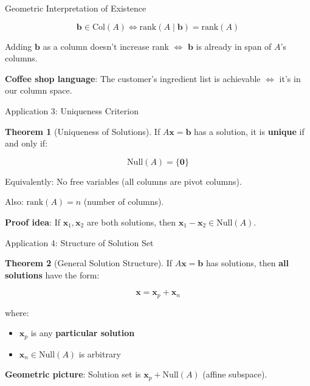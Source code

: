\documentclass[10pt]{beamer}
\theoremstyle{definition}
\newtheorem{thm}{Theorem}[section]
\newcommand{\x}[1]{\alert{\textbf{#1}}}
\begin{document}
\begin{frame}{Geometric Interpretation of Existence}

$$\mathbf{b} \in \text{Col}(A) \iff \text{rank}(A \mid \mathbf{b}) = \text{rank}(A)$$

\vspace{1em}

Adding $\mathbf{b}$ as a column doesn't increase rank $\iff$ $\mathbf{b}$ is already in span of $A$'s columns.

\vspace{1em}

\x{Coffee shop language}: The customer's ingredient list is achievable $\iff$ it's in our column space.

\end{frame}

\begin{frame}{Application 3: Uniqueness Criterion}

\begin{thm}[Uniqueness of Solutions]
If $A\mathbf{x} = \mathbf{b}$ has a solution, it is \textbf{unique} if and only if:

$$\text{Null}(A) = \{\mathbf{0}\}$$

Equivalently: No free variables (all columns are pivot columns).

Also: $\text{rank}(A) = n$ (number of columns).
\end{thm}

\vspace{1em}

\x{Proof idea}: If $\mathbf{x}_1, \mathbf{x}_2$ are both solutions, then $\mathbf{x}_1 - \mathbf{x}_2 \in \text{Null}(A)$.

\end{frame}

\begin{frame}{Application 4: Structure of Solution Set}

\begin{thm}[General Solution Structure]
If $A\mathbf{x} = \mathbf{b}$ has solutions, then \textbf{all solutions} have the form:

$$\mathbf{x} = \mathbf{x}_p + \mathbf{x}_n$$

where:
\begin{itemize}
\item $\mathbf{x}_p$ is any \textbf{particular solution}
\item $\mathbf{x}_n \in \text{Null}(A)$ is arbitrary
\end{itemize}
\end{thm}

\vspace{0.5em}

\x{Geometric picture}: Solution set is $\mathbf{x}_p + \text{Null}(A)$ (affine subspace).

\end{frame}
\end{document}
